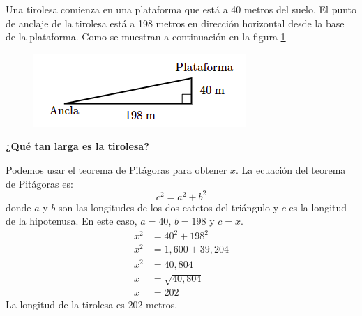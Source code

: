 Una tirolesa comienza en una plataforma que está a 40 metros del suelo.
El punto de anclaje de la tirolesa está a 198 metros en dirección horizontal desde la base de la plataforma.
Como se muestran a continuación en la figura \ref{fig:proverb_pitagoras_03}
\begin{figure}[H]
    \centering
    \includegraphics[width=0.3\linewidth]{../images/proverb_pitagoras_03.png}
    \caption{}
    \label{fig:proverb_pitagoras_03}
\end{figure}
\textbf{¿Qué tan larga es la tirolesa?}

\begin{solutionbox}{7cm}
    Podemos usar el teorema de Pitágoras para obtener $x$.
    La ecuación del teorema de Pitágoras es:
    \[c^2=a^2+b^2\]
    donde $a$ y $b$ son las longitudes de los dos catetos del triángulo y $c$ es la longitud de la hipotenusa.
    En este caso, $a=40$, $b=198$ y $c=x$.
    \begin{align*}
        x^2 & =40^2+198^2     \\
        x^2 & =1,600 + 39,204 \\
        x^2 & =40,804         \\
        x   & =\sqrt{40,804}  \\
        x   & = 202
    \end{align*}
    La longitud de la tirolesa es 202 metros.
\end{solutionbox}
